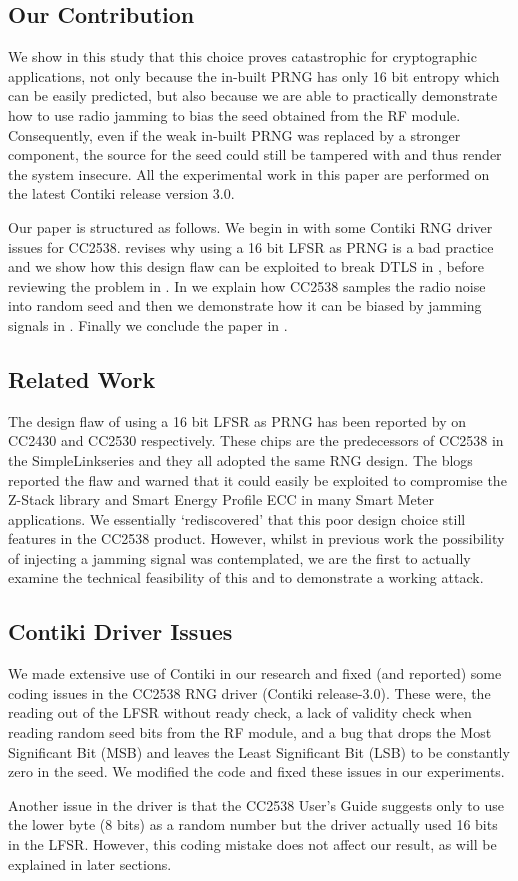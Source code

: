\subsection{Our Contribution}
We show in this study that this choice proves catastrophic for cryptographic applications, not only because the in-built PRNG has only 16 bit entropy which can be easily predicted, but also because we are able to practically demonstrate how to use radio jamming to bias the seed obtained from the RF module. Consequently, even if the weak in-built PRNG was replaced by a stronger component, the source for the seed could still be tampered with and thus render the system insecure. All the experimental work in this paper are performed on the latest Contiki release version 3.0.

Our paper is structured as follows. We begin in  with some Contiki RNG driver issues for CC2538.  revises why using a 16 bit LFSR as PRNG is a bad practice and we show how this design flaw can be exploited to break DTLS in , before reviewing the problem in . In  we explain how CC2538 samples the radio noise into random seed and then we demonstrate how it can be biased by jamming signals in . Finally we conclude the paper in .

\subsection{Related Work}
The design flaw of using a 16 bit LFSR as PRNG has been reported by \cite{SmartMeterBlog}\cite{CC2530PRNG} on CC2430\cite{CC2430Manual} and CC2530\cite{CC2530Manual} respectively. These chips are the predecessors of CC2538 in the SimpleLink\texttrademark series and they all adopted the same RNG design. The blogs reported the flaw and warned that it could easily be exploited to compromise the Z-Stack library\cite{ZStack} and Smart Energy Profile ECC in many Smart Meter applications. We essentially `rediscovered' that this poor design choice still features in the CC2538 product. However, whilst in previous work the possibility of injecting a jamming signal was contemplated, we are the first to actually examine the technical feasibility of this and to demonstrate a working attack.


\subsection{Contiki Driver Issues}\label{ContikiDriverIssue}
We made extensive use of Contiki in our research and fixed (and reported) some coding issues in the CC2538 RNG driver (Contiki release-3.0). These were, the reading out of the LFSR without ready check, a lack of validity check when reading random seed bits from the RF module, and a bug that drops the Most Significant Bit (MSB) and leaves the Least Significant Bit (LSB) to be constantly zero in the seed.  We modified the code and fixed these issues in our experiments. 

Another issue in the driver is that the CC2538 User's Guide\cite{CC2538Manual} suggests only to use the lower byte (8 bits) as a random number but the driver actually used 16 bits in the LFSR. However, this coding mistake does not affect our result, as will be explained in  later sections.